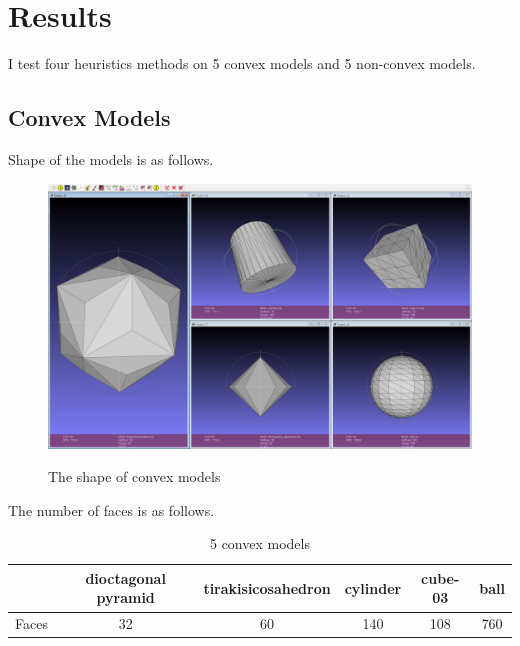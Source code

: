 \documentclass[11pt, letterpaper]{article}
\begin{document}


\section{Results}
I test four heuristics methods on 5 convex models and 5 non-convex models.


\subsection{Convex Models}
Shape of the models is as follows.
\begin{figure}[th]
\centering
{\includegraphics[height=0.4\textwidth]{FIGS/convex.jpg}}\hfill
\caption{The shape of convex models}
\label{fig:convex}
\end{figure}

The number of faces is as follows.
\begin{table}[th]
\centering
\caption{5 convex models}
\label{table:convex}
\begin{tabular}{@{}cccccc@{}}
\toprule
      & dioctagonal pyramid & tirakisicosahedron & cylinder & cube-03 & ball \\ \midrule
Faces & 32                  & 60                 & 140      & 108     & 760  \\ \bottomrule
\end{tabular}
\end{table}

\end{document}

